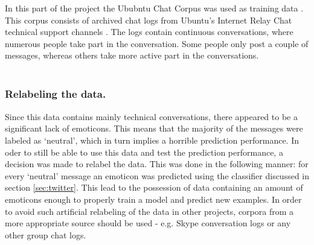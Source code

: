 In this part of the project the Ububntu Chat Corpus was used as training data . This corpus consists of archived chat logs  from Ubuntu's Internet Relay Chat technical support channels . The logs contain continuous conversations, where numerous people take part in the conversation. Some people only post a couple of messages, whereas others take more active part in the conversations.  \\ \\

\subsubsection*{Relabeling the data.} 
Since this data contains mainly technical conversations, there appeared to be a significant lack of emoticons. This means that the majority of the messages were labeled as `neutral', which in turn implies a horrible prediction performance. In oder to still be able to use this data and test the prediction performance, a decision was made to relabel the data. This was done in the following manner: for every `neutral' message an emoticon was predicted using the classifier discussed in section \ref{sec:twitter}. This lead to the possession of data containing an amount of emoticons enough to properly train a model and predict new examples. In order to avoid such artificial relabeling of the data in other projects, corpora from a more appropriate source should be used - e.g. Skype conversation logs or any other group chat logs.  
